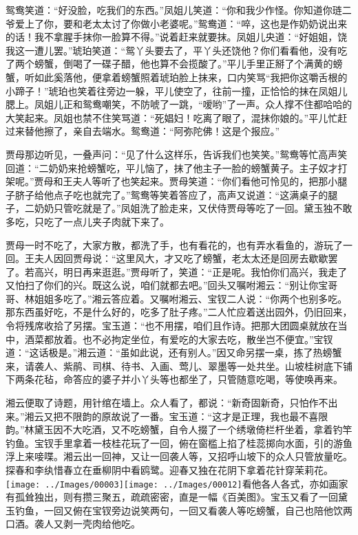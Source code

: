 鸳鸯笑道：``好没脸，吃我们的东西。''凤姐儿笑道：``你和我少作怪。你知道你琏二爷爱上了你，要和老太太讨了你做小老婆呢。''鸳鸯道：``啐，这也是作奶奶说出来的话！我不拿腥手抹你一脸算不得。''说着赶来就要抹。凤姐儿央道：``好姐姐，饶我这一遭儿罢。''琥珀笑道：``鸳丫头要去了，平丫头还饶他？你们看看他，没有吃了两个螃蟹，倒喝了一碟子醋，他也算不会揽酸了。''平儿手里正掰了个满黄的螃蟹，听如此奚落他，便拿着螃蟹照着琥珀脸上抹来，口内笑骂``我把你这嚼舌根的小蹄子！''琥珀也笑着往旁边一躲，平儿使空了，往前一撞，正恰恰的抹在凤姐儿腮上。凤姐儿正和鸳鸯嘲笑，不防唬了一跳，``嗳哟''了一声。众人撑不住都哈哈的大笑起来。凤姐也禁不住笑骂道：``死娼妇！吃离了眼了，混抹你娘的。''平儿忙赶过来替他擦了，亲自去端水。鸳鸯道：``阿弥陀佛！这是个报应。''

贾母那边听见，一叠声问：``见了什么这样乐，告诉我们也笑笑。''鸳鸯等忙高声笑回道：``二奶奶来抢螃蟹吃，平儿恼了，抹了他主子一脸的螃蟹黄子。主子奴才打架呢。''贾母和王夫人等听了也笑起来。贾母笑道：``你们看他可怜见的，把那小腿子脐子给他点子吃也就完了。''鸳鸯等笑着答应了，高声又说道：``这满桌子的腿子，二奶奶只管吃就是了。''凤姐洗了脸走来，又伏侍贾母等吃了一回。黛玉独不敢多吃，只吃了一点儿夹子肉就下来了。

贾母一时不吃了，大家方散，都洗了手，也有看花的，也有弄水看鱼的，游玩了一回。王夫人因回贾母说：``这里风大，才又吃了螃蟹，老太太还是回房去歇歇罢了。若高兴，明日再来逛逛。''贾母听了，笑道：``正是呢。我怕你们高兴，我走了又怕扫了你们的兴。既这么说，咱们就都去吧。''回头又嘱咐湘云：``别让你宝哥哥、林姐姐多吃了。''湘云答应着。又嘱咐湘云、宝钗二人说：``你两个也别多吃。那东西虽好吃，不是什么好的，吃多了肚子疼。''二人忙应着送出园外，仍旧回来，令将残席收拾了另摆。宝玉道：``也不用摆，咱们且作诗。把那大团圆桌就放在当中，酒菜都放着。也不必拘定坐位，有爱吃的大家去吃，散坐岂不便宜。''宝钗道：``这话极是。''湘云道：``虽如此说，还有别人。''因又命另摆一桌，拣了热螃蟹来，请袭人、紫鹃、司棋、待书、入画、莺儿、翠墨等一处共坐。山坡桂树底下铺下两条花毡，命答应的婆子并小丫头等也都坐了，只管随意吃喝，等使唤再来。

湘云便取了诗题，用针绾在墙上。众人看了，都说：``新奇固新奇，只怕作不出来。''湘云又把不限韵的原故说了一番。宝玉道：``这才是正理，我也最不喜限韵。''林黛玉因不大吃酒，又不吃螃蟹，自令人掇了一个绣墩倚栏杆坐着，拿着钓竿钓鱼。宝钗手里拿着一枝桂花玩了一回，俯在窗槛上掐了桂蕊掷向水面，引的游鱼浮上来唼喋。湘云出一回神，又让一回袭人等，又招呼山坡下的众人只管放量吃。探春和李纨惜春立在垂柳阴中看鸥鹭。迎春又独在花阴下拿着花针穿茉莉花。{\texttt{[image: ../Images/00003]}\texttt{[image: ../Images/00012]}\footnotesize \kaishu 看他各人各式，亦如画家有孤耸独出，则有攒三聚五，疏疏密密，直是一幅《百美图》。}宝玉又看了一回黛玉钓鱼，一回又俯在宝钗旁边说笑两句，一回又看袭人等吃螃蟹，自己也陪他饮两口酒。袭人又剥一壳肉给他吃。

